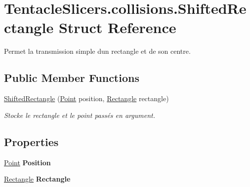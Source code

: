 \hypertarget{struct_tentacle_slicers_1_1collisions_1_1_shifted_rectangle}{}\section{Tentacle\+Slicers.\+collisions.\+Shifted\+Rectangle Struct Reference}
\label{struct_tentacle_slicers_1_1collisions_1_1_shifted_rectangle}


Permet la transmission simple d\textquotesingle{}un rectangle et de son centre.  


\subsection*{Public Member Functions}
\begin{DoxyCompactItemize}
\item 
\hyperlink{struct_tentacle_slicers_1_1collisions_1_1_shifted_rectangle_af9ab898f093c9953cbef4efa966ab5f8}{Shifted\+Rectangle} (\hyperlink{class_tentacle_slicers_1_1general_1_1_point}{Point} position, \hyperlink{class_tentacle_slicers_1_1collisions_1_1_rectangle}{Rectangle} rectangle)
\begin{DoxyCompactList}\small\item\em Stocke le rectangle et le point passés en argument. \end{DoxyCompactList}\end{DoxyCompactItemize}
\subsection*{Properties}
\begin{DoxyCompactItemize}
\item 
\mbox{\label{struct_tentacle_slicers_1_1collisions_1_1_shifted_rectangle_af0112a200fca2e13f5ccc57ad7429230}} 
\hyperlink{class_tentacle_slicers_1_1general_1_1_point}{Point} {\bfseries Position}
\item 
\mbox{\label{struct_tentacle_slicers_1_1collisions_1_1_shifted_rectangle_a25be068da16f5e5f78829cd40902876a}} 
\hyperlink{class_tentacle_slicers_1_1collisions_1_1_rectangle}{Rectangle} {\bfseries Rectangle}
\end{DoxyCompactItemize}


